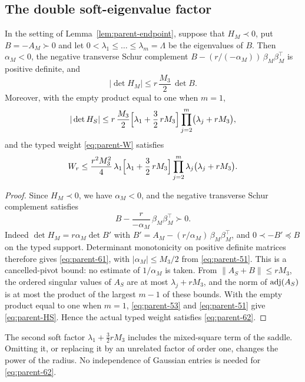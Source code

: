 \subsection{The double soft-eigenvalue factor}\label{ssec:parent-soft}

\begin{lemma}\label{lem:parent-soft}
In the setting of Lemma~\ref{lem:parent-endpoint}, suppose that $H_M\prec0$, put $B=-A_M\succ0$ and let $0<\lambda_1\le\dots\le\lambda_m=\Lambda$ be the eigenvalues of $B$. Then $\alpha_M<0$, the negative transverse Schur complement $B-(r/(-\alpha_M))\,\beta_M\beta_M^{\top}$ is positive definite, and
\begin{equation}\label{eq:parent-61}
|\det H_M|\le r\,\frac{M_3}2\,\det B .
\end{equation}
Moreover, with the empty product equal to one when $m=1$,
\begin{equation}\label{eq:parent-HS}
|\det H_S|\le r\,\frac{M_3}2\Bigl[\lambda_1+\frac32\,rM_3\Bigr]\prod_{j=2}^m\bigl(\lambda_j+rM_3\bigr),
\end{equation}
and the typed weight \eqref{eq:parent-W} satisfies
\begin{equation}\label{eq:parent-62}
W_r\le\frac{r^2M_3^2}4\,\lambda_1\Bigl[\lambda_1+\frac32\,rM_3\Bigr]\prod_{j=2}^m\lambda_j\bigl(\lambda_j+rM_3\bigr).
\end{equation}
\end{lemma}

\begin{proof}
Since $H_M\prec0$, we have $\alpha_M<0$, and the negative transverse Schur complement satisfies
\[
B-\frac r{-\alpha_M}\,\beta_M\beta_M^{\top}\succ0 .
\]
Indeed $\det H_M=r\alpha_M\det B'$ with $B'=A_M-(r/\alpha_M)\,\beta_M\beta_M^{\top}$, and $0\prec-B'\preceq B$ on the typed support. Determinant monotonicity on positive definite matrices therefore gives \eqref{eq:parent-61}, with $|\alpha_M|\le M_3/2$ from \eqref{eq:parent-51}. This is a cancelled-pivot bound: no estimate of $1/\alpha_M$ is taken. From $\|A_S+B\|\le rM_3$, the ordered singular values of $A_S$ are at most $\lambda_j+rM_3$, and the norm of $\operatorname{adj}(A_S)$ is at most the product of the largest $m-1$ of these bounds. With the empty product equal to one when $m=1$, \eqref{eq:parent-53} and \eqref{eq:parent-51} give \eqref{eq:parent-HS}. Hence the actual typed weight satisfies \eqref{eq:parent-62}.
\end{proof}

The second soft factor $\lambda_1+\frac32rM_3$ includes the mixed-square term of the saddle. Omitting it, or replacing it by an unrelated factor of order one, changes the power of the radius. No independence of Gaussian entries is needed for \eqref{eq:parent-62}.

